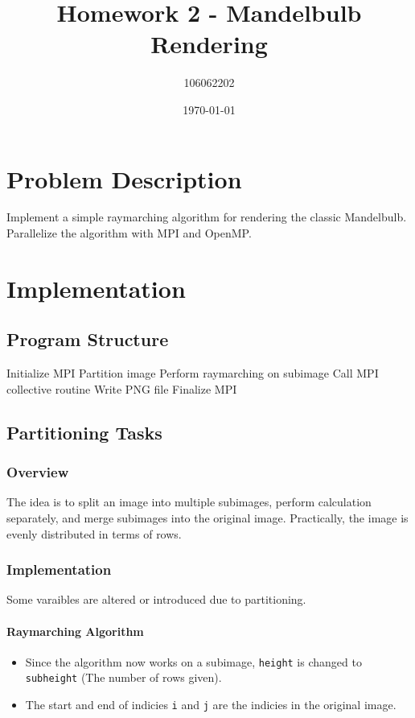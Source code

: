 \documentclass[a4paper, 10pt]{article}
\title{Homework 2 - Mandelbulb Rendering}
\author{106062202}
\date{\today}
\begin{document}
  \maketitle

  \section{Problem Description}
    Implement a simple raymarching algorithm for rendering the classic Mandelbulb.\\
    Parallelize the algorithm with MPI and OpenMP.

  \section{Implementation}
    \subsection{Program Structure}
      \begin{algorithmic}[1]
        \State Initialize MPI
        \State Partition image
        \State Perform raymarching on subimage
        \State Call MPI collective routine
        \State Write PNG file
        \State Finalize MPI
      \end{algorithmic}

    \subsection{Partitioning Tasks}
      \subsubsection{Overview}
        The idea is to split an image into multiple subimages, 
        perform calculation separately, and merge subimages into the original image. 
        Practically, the image is evenly distributed in terms of rows.

      \subsubsection{Implementation}
        Some varaibles are altered or introduced due to partitioning.

        \paragraph{Raymarching Algorithm}
          \begin{itemize}
            \item Since the algorithm now works on a subimage, 
              \texttt{height} is changed to \texttt{subheight} (The number of rows given).
            \item The start and end of indicies \texttt{i} and \texttt{j} are the indicies 
              in the original image.
          \end{itemize}
\end{document}

